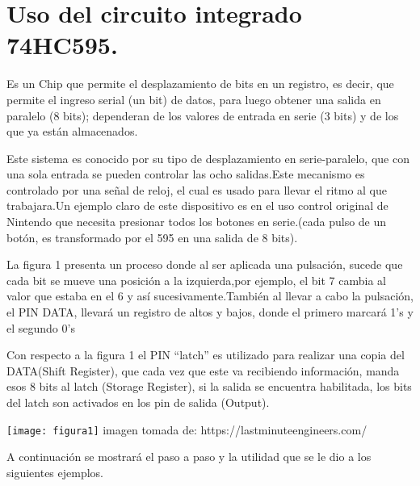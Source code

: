 \documentclass{article}
\begin{document}
\newpage
\section{Uso del circuito integrado 74HC595.}
\label{74HC595}


Es un Chip que permite el desplazamiento de bits en un registro, es decir, que permite el ingreso serial (un bit) de datos, para luego obtener una salida en paralelo (8 bits); dependeran de los valores de entrada en serie (3 bits) y de los que ya están almacenados.

Este sistema es conocido por su tipo de desplazamiento en serie-paralelo, que con una sola entrada se pueden controlar las ocho salidas.Este mecanismo es controlado por una señal de reloj, el cual es usado para llevar el ritmo al que trabajara.Un ejemplo claro de este dispositivo es en el uso control original de Nintendo que necesita presionar todos los botones en serie.(cada pulso de un botón, es transformado por el 595 en una salida de 8 bits).

La figura 1 presenta un proceso donde al ser aplicada una pulsación, sucede que cada bit se mueve una posición a la izquierda,por ejemplo, el bit 7 cambia al valor que estaba en el 6 y así sucesivamente.También al llevar a cabo la pulsación, el PIN DATA, llevará un registro de altos y bajos, donde el primero marcará 1’s y el segundo 0’s

Con respecto a la figura 1 el PIN “latch” es utilizado para realizar una copia del DATA(Shift Register), que cada vez que este va recibiendo información, manda esos 8 bits al latch (Storage Register), si la salida se encuentra habilitada, los bits del latch son activados en los pin de salida (Output).


\centering
\texttt{[image: figura1]}
imagen tomada de: https://lastminuteengineers.com/
\newpage

A continuación se mostrará el paso a paso y la utilidad que se le dio a los siguientes ejemplos.\newline
\end{document}
